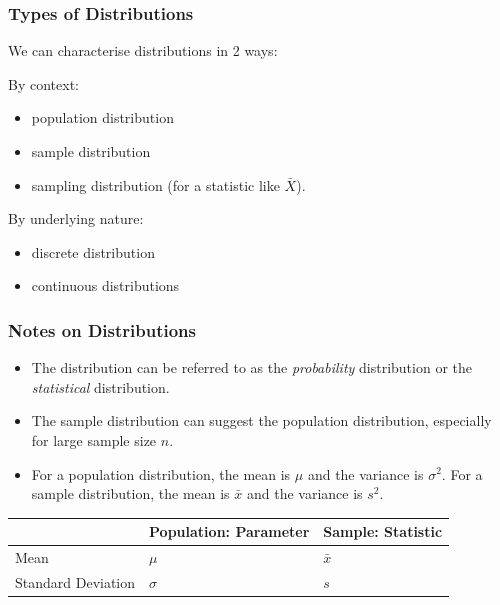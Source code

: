 \documentclass[t,xcolor=pdftex,dvipsnames,table]{beamer}\usepackage[]{graphicx}\usepackage[]{color}
\begin{document}
\begin{frame}\frametitle{Types of Distributions}

\begin{definition}
We can characterise distributions in 2 ways:

\vspace{.5cm}
By \alert{context}:
\begin{itemize}
\item population distribution
\item sample distribution
\item sampling distribution (for a statistic like $\bar{X}$).
\end{itemize}

\vspace{.5cm}
By \alert{underlying nature}:
\begin{itemize}
\item discrete distribution 
\item continuous distributions
\end{itemize}
\end{definition}
\end{frame}

\begin{frame}\frametitle{Notes on Distributions}
\begin{itemize}
\item
The distribution can be referred to as the {\it probability} distribution or the {\it statistical} distribution.
\item The sample distribution can suggest the population distribution, especially for large sample size $n$. 
\item For a population distribution, the mean is $\mu$ and the variance is $\sigma^2$. For a sample distribution, the mean is $\bar{x}$ and the variance is $s^2$.
\end{itemize}

\vspace{.5cm}
\begin{tabular}{l|l|l}
 & Population: Parameter & Sample: Statistic \\ \hline
Mean & $\mu$ & $\bar{x}$ \\ \hline
Standard Deviation & $\sigma$ & $s$ \\ \hline
\end{tabular}


\end{frame}
  
\end{document}
